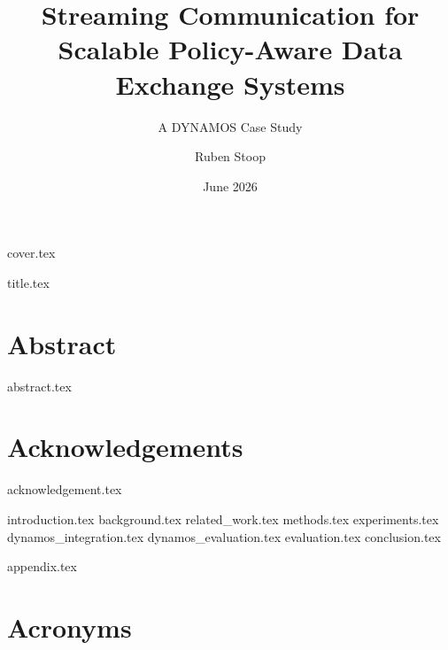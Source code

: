 \documentclass[a4paper,twoside,onecolumn,openright,10pt]{mscthesis}
\title{Streaming Communication for Scalable Policy-Aware Data Exchange Systems}
\subtitle{A DYNAMOS Case Study}
\date{June 2026}
\author{Ruben Stoop}
\begin{document}
%
%

\frontmatter
{cover.tex}

\cleartorecto{}
{title.tex}


\cleartorecto{}
\chapter{Abstract}
{abstract.tex}

\cleartorecto{}
\tableofcontents{}
\clearpage{}

\listoffigures{}
\clearpage{}

\listoftables{}
\clearpage{}

\cleartorecto{}
\chapter{Acknowledgements}
{acknowledgement.tex}


\mainmatter

{introduction.tex}
{background.tex}
{related_work.tex}
{methods.tex}
{experiments.tex}
{dynamos_integration.tex}
{dynamos_evaluation.tex}
{evaluation.tex}
{conclusion.tex}

%
%

\appendix

{appendix.tex}
\clearpage

%
%

\backmatter

\printbibliography{}
\cleardoublepage{}

\chapter{Acronyms}

\cleardoublepage{}
\end{document}
